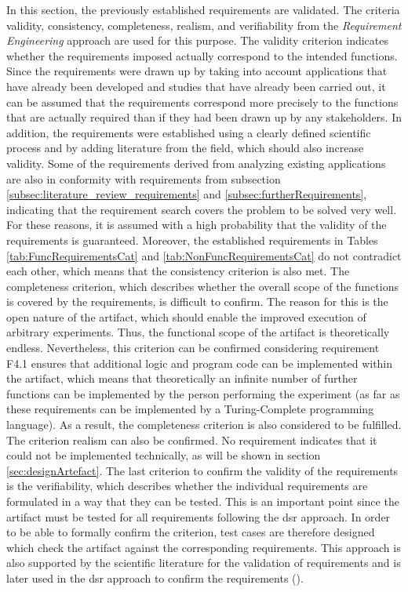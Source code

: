 In this section, the previously established requirements are validated. The criteria validity, consistency, completeness, realism, and verifiability from the \textit{Requirement Engineering} approach are used for this purpose. The validity criterion indicates whether the requirements imposed actually correspond to the intended functions. Since the requirements were drawn up by taking into account applications that have already been developed and studies that have already been carried out, it can be assumed that the requirements correspond more precisely to the functions that are actually required than if they had been drawn up by any stakeholders. In addition, the requirements were established using a clearly defined scientific process and by adding literature from the field, which should also increase validity. Some of the requirements derived from analyzing existing applications are also in conformity with requirements from subsection \ref{subsec:literature_review_requirements} and \ref{subsec:furtherRequirements}, indicating that the requirement search covers the problem to be solved very well. For these reasons, it is assumed with a high probability that the validity of the requirements is guaranteed. Moreover, the established requirements in Tables \ref{tab:FuncRequirementsCat} and \ref{tab:NonFuncRequirementsCat} do not contradict each other, which means that the consistency criterion is also met. The completeness criterion, which describes whether the overall scope of the functions is covered by the requirements, is difficult to confirm. The reason for this is the open nature of the artifact, which should enable the improved execution of arbitrary experiments. Thus, the functional scope of the artifact is theoretically endless. Nevertheless, this criterion can be confirmed considering requirement F4.1 ensures that additional logic and program code can be implemented within the artifact, which means that theoretically an infinite number of further functions can be implemented by the person performing the experiment (as far as these requirements can be implemented by a Turing-Complete programming language). As a result, the completeness criterion is also considered to be fulfilled. The criterion realism can also be confirmed. No requirement indicates that it could not be implemented technically, as will be shown in section \ref{sec:designArtefact}. The last criterion to confirm the validity of the requirements is the verifiability, which describes whether the individual requirements are formulated in a way that they can be tested. This is an important point since the artifact must be tested for all requirements following the \ac{dsr} approach. In order to be able to formally confirm the criterion, test cases are therefore designed which check the artifact against the corresponding requirements. This approach is also supported by the scientific literature for the validation of requirements and is later used in the \ac{dsr} approach to confirm the requirements (\cite{Sommerville.2011}).


